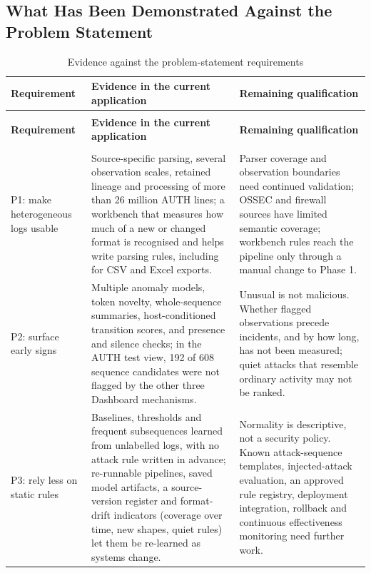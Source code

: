 \documentclass[11pt,a4paper]{article}
\begin{document}
\subsection{What Has Been Demonstrated Against the Problem Statement}


\begingroup
\small
\begin{longtable}{>{\RaggedRight\arraybackslash}p{}>{\RaggedRight\arraybackslash}p{}>{\RaggedRight\arraybackslash}p{}}
\caption{Evidence against the problem-statement requirements}\label{tab:9}\\
\toprule
\rowcolor{pale} \textbf{Requirement} & \textbf{Evidence in the current application} & \textbf{Remaining qualification} \\
\midrule
\endfirsthead
\multicolumn{3}{l}{\small\itshape Table \thetable{} --- continued}\\
\toprule
\rowcolor{pale} \textbf{Requirement} & \textbf{Evidence in the current application} & \textbf{Remaining qualification} \\
\midrule
\endhead
\midrule
\multicolumn{3}{r}{\footnotesize Continued on the next page}\\
\endfoot
\bottomrule
\endlastfoot
P1: make heterogeneous logs usable & Source-specific parsing, several observation scales, retained lineage and processing of more than 26 million AUTH lines; a workbench that measures how much of a new or changed format is recognised and helps write parsing rules, including for CSV and Excel exports. & Parser coverage and observation boundaries need continued validation; OSSEC and firewall sources have limited semantic coverage; workbench rules reach the pipeline only through a manual change to Phase 1. \\[3pt]
P2: surface early signs & Multiple anomaly models, token novelty, whole-sequence summaries, host-conditioned transition scores, and presence and silence checks; in the AUTH test view, 192 of 608 sequence candidates were not flagged by the other three Dashboard mechanisms. & Unusual is not malicious. Whether flagged observations precede incidents, and by how long, has not been measured; quiet attacks that resemble ordinary activity may not be ranked. \\[3pt]
P3: rely less on static rules & Baselines, thresholds and frequent subsequences learned from unlabelled logs, with no attack rule written in advance; re-runnable pipelines, saved model artifacts, a source-version register and format-drift indicators (coverage over time, new shapes, quiet rules) let them be re-learned as systems change. & Normality is descriptive, not a security policy. Known attack-sequence templates, injected-attack evaluation, an approved rule registry, deployment integration, rollback and continuous effectiveness monitoring need further work. \\[3pt]

\end{longtable}
\end{document}
